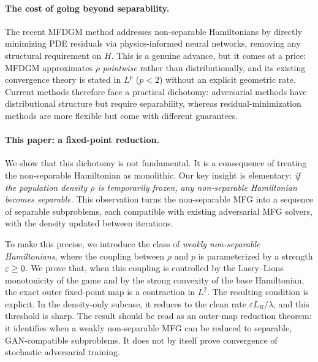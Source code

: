 \paragraph{The cost of going beyond separability.}
The recent MFDGM method \citep{assouline2023deep} addresses non-separable
Hamiltonians by directly minimizing PDE residuals via physics-informed
neural networks, removing any structural requirement on $H$.
This is a genuine advance, but it comes at a price:
MFDGM approximates $\rho$ \emph{pointwise} rather than distributionally,
and its existing convergence theory is stated in $L^p$ ($p<2$) without an
explicit geometric rate.
Current methods therefore face a practical dichotomy:
adversarial methods have distributional structure but require separability,
whereas residual-minimization methods are more flexible but come with
different guarantees.

\paragraph{This paper: a fixed-point reduction.}
We show that this dichotomy is not fundamental.
It is a consequence of treating the non-separable Hamiltonian as monolithic.
Our key insight is elementary: \emph{if the population density $\rho$ is
temporarily frozen, any non-separable Hamiltonian becomes separable.}
This observation turns the non-separable MFG into a sequence of separable
subproblems, each compatible with existing adversarial MFG solvers, with the
density updated between iterations.

To make this precise, we introduce the class of
\emph{weakly non-separable Hamiltonians}, where the coupling between $\rho$
and $p$ is parameterized by a strength $\varepsilon \geq 0$.
We prove that, when this coupling is controlled by the Lasry--Lions
monotonicity of the game and by the strong convexity of the base Hamiltonian,
the exact outer fixed-point map is a contraction in $L^2$.  The resulting
condition is explicit.  In the density-only subcase, it reduces to the clean
rate $\varepsilon L_R/\lambda$, and this threshold is sharp.  The result should
be read as an outer-map reduction theorem: it identifies when a weakly
non-separable MFG can be reduced to separable, GAN-compatible subproblems.  It
does not by itself prove convergence of stochastic adversarial training.

